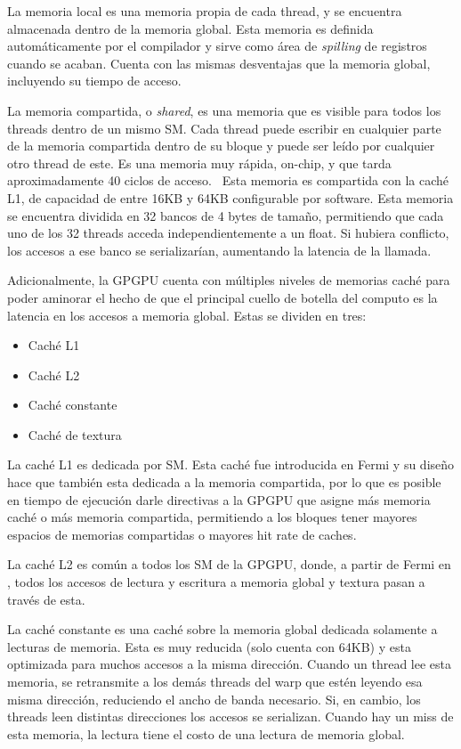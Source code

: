 La memoria local es una memoria propia de cada thread, y se encuentra almacenada dentro de la
memoria global. Esta memoria es definida autom\'aticamente por el compilador y sirve como \'area de \textit{spilling}
de registros cuando se acaban. Cuenta con las mismas desventajas que la memoria global, incluyendo
su tiempo de acceso.

La memoria compartida, o \textit{shared}, es una memoria que es visible para todos los threads dentro
de un mismo SM. Cada thread puede escribir en cualquier parte de la memoria compartida dentro de su bloque y
puede ser le\'ido por cualquier otro thread de este. Es una memoria muy r\'apida, on-chip, y
que tarda aproximadamente 40 ciclos de acceso.~\cite{Demystifying} Esta memoria es compartida con la cach\'e
L1, de capacidad de entre 16KB y 64KB configurable por software. Esta memoria se encuentra dividida
en 32 bancos de 4 bytes de tama\~no, permitiendo que cada uno de los 32 threads acceda independientemente
a un float. Si hubiera conflicto, los accesos a ese banco se serializar\'ian, aumentando la latencia
de la llamada.~\cite{farberCuda}

Adicionalmente, la GPGPU cuenta con m\'ultiples niveles de memorias cach\'e para poder aminorar el hecho
de que el principal cuello de botella del computo es la latencia en los accesos a memoria global.
Estas se dividen en tres:

\begin{itemize}
  \item Cach\'e L1
  \item Cach\'e L2
  \item Cach\'e constante
  \item Cach\'e de textura
\end{itemize}

La cach\'e L1 es dedicada por SM. Esta cach\'e fue introducida en Fermi y su dise\~no hace que
tambi\'en esta dedicada a la memoria compartida, por lo que es posible en tiempo de ejecuci\'on
darle directivas a la GPGPU que asigne m\'as memoria cach\'e o m\'as memoria compartida,
permitiendo a los bloques tener mayores espacios de memorias compartidas o mayores hit rate de caches.

La cach\'e L2 es com\'un a todos los SM de la GPGPU, donde, a partir de Fermi en \nvidia, todos
los accesos de lectura y escritura a memoria global y textura pasan a trav\'es de esta. ~\cite{NvidiaFermi}

La cach\'e constante es una cach\'e sobre la memoria global dedicada solamente a lecturas de memoria. Esta
es muy reducida (solo cuenta con 64KB) y esta optimizada para muchos accesos a la misma direcci\'on. Cuando
un thread lee esta memoria, se retransmite a los dem\'as threads del warp que est\'en leyendo esa misma direcci\'on, reduciendo
el ancho de banda necesario. Si, en cambio, los threads leen distintas direcciones los accesos se serializan.
Cuando hay un miss de esta memoria, la lectura tiene el costo de una lectura de memoria global.

